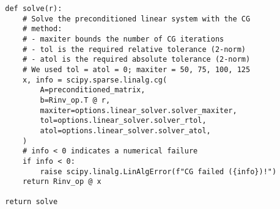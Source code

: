 \begin{verbatim}
        def solve(r):
            # Solve the preconditioned linear system with the CG
            # method:
            # - maxiter bounds the number of CG iterations
            # - tol is the required relative tolerance (2-norm)
            # - atol is the required absolute tolerance (2-norm)
            # We used tol = atol = 0; maxiter = 50, 75, 100, 125
            x, info = scipy.sparse.linalg.cg(
                A=preconditioned_matrix,
                b=Rinv_op.T @ r,
                maxiter=options.linear_solver.solver_maxiter,
                tol=options.linear_solver.solver_rtol,
                atol=options.linear_solver.solver_atol,
            )
            # info < 0 indicates a numerical failure
            if info < 0:
                raise scipy.linalg.LinAlgError(f"CG failed ({info})!")
            return Rinv_op @ x

        return solve
\end{verbatim}
